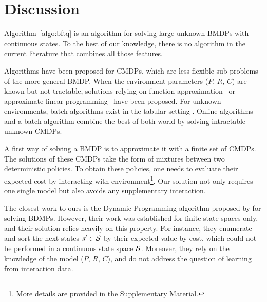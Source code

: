 \documentclass{article}
\begin{document}
\section{Discussion}

Algorithm~\ref{algo:bftq} is an algorithm for solving large unknown BMDPs with continuous states. To the best of our knowledge, there is no algorithm in the current literature that combines all those features.


Algorithms have been proposed for CMDPs, which are less flexible sub-problems of the more general BMDP. When the environment parameters ($P$, $R$, $C$) are known but not tractable, solutions relying on function approximation~\citep{Undurti} or approximate linear programming~\citep{Poupart2015} have been proposed. For unknown environments, batch algorithms exist in the tabular setting \citep{Thomas2015, Petrik2016, Laroche2017}. Online algorithms \citep{Geibel2005, Abe2010,ChowGJP15,AchiamHTA17} and a batch algorithm \citep{le2019batch} combine the best of both world by solving intractable unknown CMDPs.

A first way of solving a BMDP is to approximate it with a finite set of CMDPs. The solutions of these CMDPs take the form of mixtures between two deterministic policies\citep[Theorem 4.4][]{BEUTLER1985236}. To obtain these policies, one needs to evaluate their expected cost by interacting with environment\footnote{More details are provided in the Supplementary Material.}. Our solution not only requires one single model but also avoids any supplementary interaction.

The closest work to ours is the Dynamic Programming algorithm proposed by \citet{Boutilier_Lu:uai16} for solving BDMPs. However, their work was established for finite state spaces only, and their solution relies heavily on this property. For instance, they enumerate and sort the next states $s'\in\mathcal{S}$ by their expected value-by-cost, which could not be performed in a continuous state space $\mathcal{S}$. Moreover, they rely on the knowledge of the model ($P$, $R$, $C$), and do not address the question of learning from interaction data.
\end{document}
